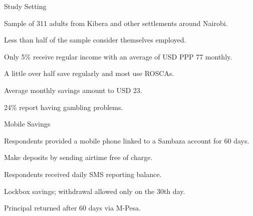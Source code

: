 \documentclass[aspectratio=169]{beamer}
\newenvironment{wideitemize}{\itemize\addtolength{\itemsep}{10pt}}{\enditemize}
\begin{document}
\begin{frame}{Study Setting}

	Sample of 311 adults from Kibera and other settlements around Nairobi.

	\begin{wideitemize}
		\item Less than half of the sample consider themselves employed.
		\item Only 5\% receive regular income with an average of USD PPP 77 monthly.
		\item A little over half save regularly and most use ROSCAs.
		\item Average monthly savings amount to USD 23.
		\item 24\% report having gambling problems.
	\end{wideitemize}



\end{frame}

\begin{frame}{Mobile Savings}
	
	\begin{wideitemize}
		\item Respondents provided a mobile phone linked to a Sambaza account for 60 days.
		\item Make deposits by sending airtime free of charge.
		\item Respondents received daily SMS reporting balance.
		\item Lockbox savings; withdrawal allowed only on the 30th day.
		\item Principal returned after 60 days via M-Pesa.
	\end{wideitemize}



\end{frame}
\end{document}
